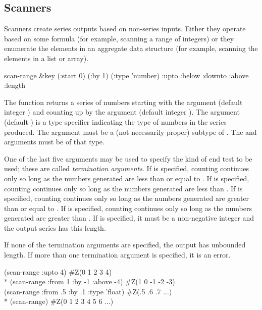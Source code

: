 \subsection{Scanners}

Scanners create series outputs based on non-series inputs.  Either they
operate based on some formula (for example, scanning a range of integers) or they
enumerate the elements in an aggregate data structure (for example, scanning the
elements in a list or array).


\begin{defun}[Function]
scan-range &key (:start 0) (:by 1) (:type 'number)
    :upto :below :downto :above :length

The function  returns a series of numbers starting with the
 argument
(default integer ) and counting up by the  argument (default
integer ).  The  argument (default ) is
a type specifier indicating the type of numbers in the series
produced.  The  argument must be a (not necessarily proper) subtype of
.  The  and  arguments must be of that type.

One of the last five arguments may be used
to specify the kind of end test to be used;
these are called {\it termination arguments}.
If  is specified, counting continues only so long as the
numbers generated are less than or equal to .  If 
 is specified, counting continues only so long as the numbers
generated are less than .  If  is specified,
counting continues only so long as the numbers generated are greater
than or equal to .  If  is specified,
counting continues only so long as the numbers generated are greater
than .  If  is specified, it must be a
non-negative integer and the output series has this length.

If none
of the termination arguments are specified, the output has unbounded
length.  If more than one termination argument is specified, it is an error.

\begin{lisp}
(scan-range :upto 4) {\EV} \#Z(0 1 2 3 4) \\*
(scan-range :from 1 :by -1 :above -4) {\EV} \#Z(1 0 -1 -2 -3) \\
(scan-range :from .5 :by .1 :type 'float) {\EV} \#Z(.5 .6 .7 ...) \\*
(scan-range) {\EV} \#Z(0 1 2 3 4 5 6 ...)
\end{lisp}
\end{defun}


